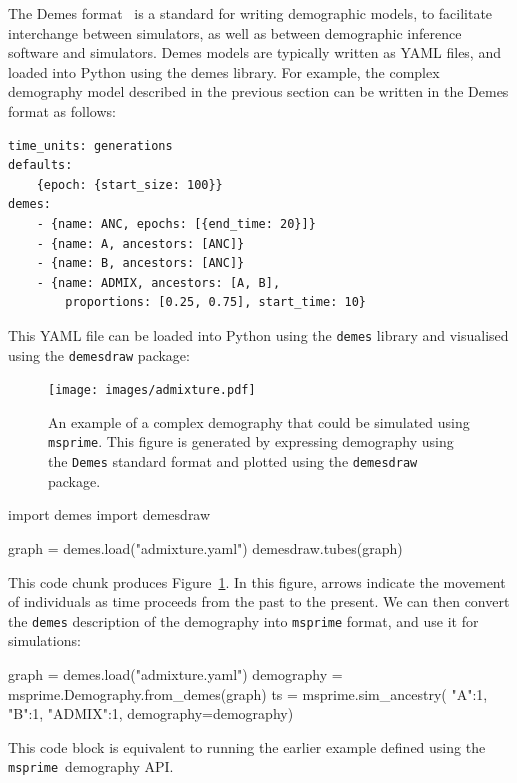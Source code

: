 \documentclass[graybox]{svmult}
\newcommand{\msprime}[0]{\texttt{msprime}}
\begin{document}
The Demes format~\citep{gower2022demes} is a standard for writing
demographic models, to facilitate interchange between simulators, as well as between
demographic inference software and simulators. Demes models are typically written as
YAML files, and loaded into Python using the demes library.
For example, the complex demography model described in the previous section can be
written in the Demes format as follows:

\begin{footnotesize}
\begin{verbatim}
time_units: generations
defaults:
    {epoch: {start_size: 100}}
demes:
    - {name: ANC, epochs: [{end_time: 20}]}
    - {name: A, ancestors: [ANC]}
    - {name: B, ancestors: [ANC]}
    - {name: ADMIX, ancestors: [A, B],
        proportions: [0.25, 0.75], start_time: 10}
\end{verbatim}
\end{footnotesize}

This YAML file can be loaded into Python using the \texttt{demes} library and 
visualised using the \texttt{demesdraw} package:

\begin{figure}[t]
\centering
\texttt{[image: images/admixture.pdf]}
\caption{\label{fig:complex-demography}An example of a complex demography that could be
simulated using \msprime. This figure is generated by expressing demography using the
\texttt{Demes} standard format and plotted using the \texttt{demesdraw} package.}
\end{figure}

\begin{pythoncode}
import demes
import demesdraw

graph = demes.load("admixture.yaml")
demesdraw.tubes(graph)
\end{pythoncode}
This code chunk produces Figure~\ref{fig:complex-demography}. In this figure, arrows indicate
the movement of individuals as time proceeds from the past to the present.
We can then convert the \texttt{demes} description of the demography
into \texttt{msprime} format, and use it for simulations:
\begin{pythoncode}
graph = demes.load("admixture.yaml")
demography = msprime.Demography.from_demes(graph)
ts = msprime.sim_ancestry(
    {"A":1, "B":1, "ADMIX":1},
    demography=demography)
\end{pythoncode}
This code block is 
equivalent to running the earlier example defined using the \msprime\
demography API.
\end{document}
